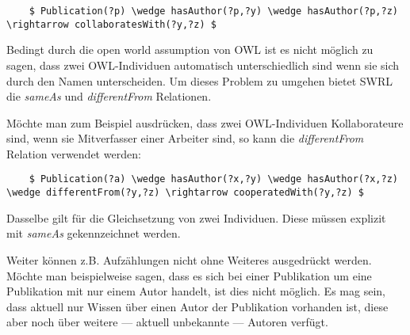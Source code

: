 \lstset{language=XML}
\begin{lstlisting}
    $ Publication(?p) \wedge hasAuthor(?p,?y) \wedge hasAuthor(?p,?z) \rightarrow collaboratesWith(?y,?z) $
\end{lstlisting}

Bedingt durch die open world assumption von OWL ist es nicht möglich zu sagen, dass zwei OWL-Individuen automatisch unterschiedlich sind wenn sie sich durch den Namen unterscheiden. Um dieses Problem zu umgehen bietet SWRL die \textit{sameAs} und \textit{differentFrom} Relationen.

Möchte man zum Beispiel ausdrücken, dass zwei OWL-Individuen Kollaborateure sind, wenn sie Mitverfasser einer Arbeiter sind, so kann die \textit{differentFrom} Relation verwendet werden:

\lstset{language=XML}
\begin{lstlisting}
    $ Publication(?a) \wedge hasAuthor(?x,?y) \wedge hasAuthor(?x,?z) \wedge differentFrom(?y,?z) \rightarrow cooperatedWith(?y,?z) $
\end{lstlisting}

Dasselbe gilt für die Gleichsetzung von zwei Individuen. Diese müssen explizit mit \textit{sameAs} gekennzeichnet werden.

Weiter können z.B. Aufzählungen nicht ohne Weiteres ausgedrückt werden. Möchte man beispielweise sagen, dass es sich bei einer Publikation um eine Publikation mit nur einem Autor handelt, ist dies nicht möglich. Es mag sein, dass aktuell nur Wissen über einen Autor der Publikation vorhanden ist, diese aber noch über weitere --- aktuell unbekannte --- Autoren verfügt.
